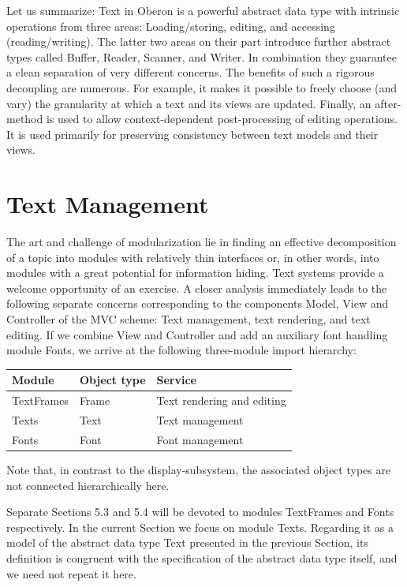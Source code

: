 Let us summarize: Text in Oberon is a powerful abstract data type with intrinsic operations from
three areas: Loading/storing, editing, and accessing (reading/writing). The latter two areas on their
part introduce further abstract types called Buffer, Reader, Scanner, and Writer. In combination
they guarantee a clean separation of very different concerns. The benefits of such a rigorous
decoupling are numerous. For example, it makes it possible to freely choose (and vary) the
granularity at which a text and its views are updated. Finally, an after-method is used to allow
context-dependent post-processing of editing operations. It is used primarily for preserving
consistency between text models and their views.

\section{Text Management}
\label{sec:textmanagement}
The art and challenge of modularization lie in finding an effective decomposition of a topic into
modules with relatively thin interfaces or, in other words, into modules with a great potential for
information hiding. Text systems provide a welcome opportunity of an exercise. A closer analysis
immediately leads to the following separate concerns corresponding to the components Model,
View and Controller of the MVC scheme: Text management, text rendering, and text editing. If we
combine View and Controller and add an auxiliary font handling module Fonts, we arrive at the
following three-module import hierarchy:
\begin{table}[h!]
	\begin{tabular}{l l l}
		Module     &Object type &Service \\\hline
		TextFrames &Frame       &Text rendering and editing\\
		Texts      &Text        &Text management \\
		Fonts      &Font        &Font management
	\end{tabular}
\end{table}

Note that, in contrast to the display-subsystem, the associated object types are not connected hierarchically here.

Separate Sections 5.3 and 5.4 will be devoted to modules TextFrames and Fonts respectively. In
the current Section we focus on module Texts. Regarding it as a model of the abstract data type
Text presented in the previous Section, its definition is congruent with the specification of the
abstract data type itself, and we need not repeat it here.

